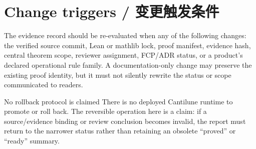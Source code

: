 \section{Change triggers / 变更触发条件}

{\raggedright
The evidence record should be re-evaluated when any of the following changes: the verified source
commit, Lean or mathlib lock, proof manifest, evidence hash, central theorem scope, reviewer
assignment, FCP/ADR status, or a product's declared operational rule family. A documentation-only
change may preserve the existing proof identity, but it must not silently rewrite the status or
scope communicated to readers.\par}

\begin{MWCallout}[MWAmber]{No rollback protocol is claimed}
There is no deployed Cantilune runtime to promote or roll back. The reversible operation here is a
claim: if a source/evidence binding or review conclusion becomes invalid, the report must return
to the narrower status rather than retaining an obsolete “proved” or “ready” summary.
\end{MWCallout}
